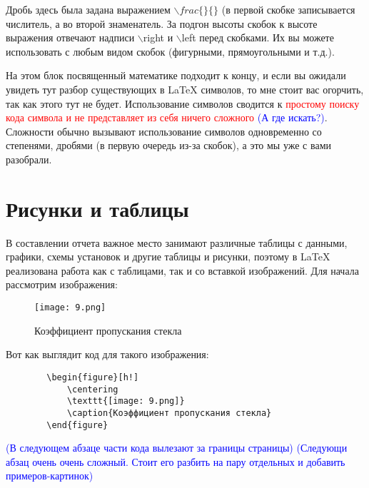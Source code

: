     Дробь здесь была задана выражением $\backslash frac\{\}\{\}$ (в первой скобке записывается числитель, а во второй знаменатель. За подгон высоты скобок к высоте выражения отвечают надписи $\backslash$right и $\backslash$left перед скобками. Их вы можете использовать с любым видом скобок (фигурными, прямоугольными и т.д.).
    
    
    
    На этом блок посвященный математике подходит к концу, и если вы ожидали увидеть тут разбор существующих в \LaTeX{} символов, то мне стоит вас огорчить, так как этого тут не будет. Использование символов сводится к \textcolor{Red}{простому поиску кода символа и не представляет из себя ничего сложного} \textcolor{Blue}{(А где искать?)}. Сложности обычно вызывают использование символов одновременно со степенями, дробями (в первую очередь из-за скобок), а это мы уже с вами разобрали.

    \section{Рисунки и таблицы}

    В составлении отчета важное место занимают различные таблицы с данными, графики, схемы установок и другие таблицы и рисунки, поэтому в \LaTeX{} реализована работа как с таблицами, так и со вставкой изображений. Для начала рассмотрим изображения:
    
    \begin{figure}[h!]
        \centering
        \texttt{[image: 9.png]}
        \caption{Коэффициент пропускания стекла}
    \end{figure}
    
    Вот как выглядит код для такого изображения:
    
    \begin{verbatim}
        \begin{figure}[h!]
            \centering
            \texttt{[image: 9.png]}
            \caption{Коэффициент пропускания стекла}
        \end{figure}
    \end{verbatim}
    
    \textcolor{Blue}{(В следующем абзаце части кода вылезают за границы страницы)}
    \textcolor{Blue}{(Следующи абзац очень очень сложный. Стоит его разбить на пару отдельных и добавить примеров-картинок)}

